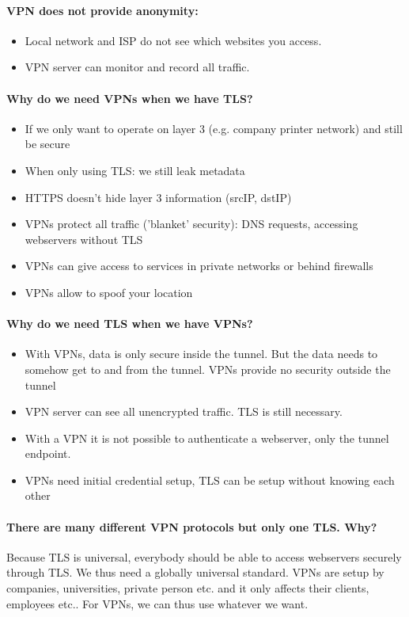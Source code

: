 \paragraph{VPN does not provide anonymity:} 
\begin{itemize}
    \item Local network and ISP do not see which websites you access.
    \item VPN server can monitor and record all traffic.
\end{itemize}

\paragraph{Why do we need VPNs when we have TLS?}
\vspace{-\topsep}
\begin{itemize}
	\item If we only want to operate on layer 3 (e.g. company printer network) and still be secure
	\item When only using TLS: we still leak metadata
	\item HTTPS doesn't hide layer 3 information (srcIP, dstIP)
	\item VPNs protect all traffic ('blanket' security): DNS requests, accessing webservers without TLS
	\item VPNs can give access to services in private networks or behind firewalls
	\item VPNs allow to spoof your location
\end{itemize}

\paragraph{Why do we need TLS when we have VPNs?}
\begin{itemize}
	\item With VPNs, data is only secure inside the tunnel. But the data needs to somehow get to and from the tunnel. VPNs provide no security outside the tunnel
	\item VPN server can see all unencrypted traffic. TLS is still necessary.
	\item With a VPN it is not possible to authenticate a webserver, only the tunnel endpoint.
	\item VPNs need initial credential setup, TLS can be setup without knowing each other
\end{itemize}

\paragraph{There are many different VPN protocols but only one TLS. Why?}
Because TLS is universal, everybody should be able to access webservers securely through TLS.  We thus need a globally universal standard. VPNs are setup by companies, universities, private person etc. and it only affects their clients, employees etc.. For VPNs, we can thus use whatever we want.

